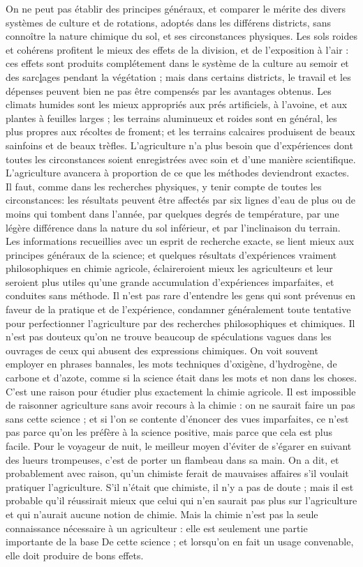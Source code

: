 On ne peut pas établir des principes généraux, et comparer le mérite des divers systèmes de culture et de rotations, adoptés dans les différens districts, sans connoître la nature chimique du sol, et ses circonstances physiques. Les sols roides et cohérens profitent le mieux des effets de la division, et de l'exposition à l'air : ces effets sont produits complétement dans le système de la culture au semoir et des sarc\underline{l}ages pendant la végétation ; mais dans certains districts, le travail et les dépenses peuvent bien ne pas être compensés par les avantages obtenus. Les climats humides sont les mieux appropriés aux prés artificiels, à l'avoine, et aux plantes à feuilles larges ; les terrains\setcounter{page}{353} aluminueux et roides sont en général, les plus propres aux récoltes de froment; et les terrains calcaires produisent de beaux sainfoins et de beaux trèfles.
L'agriculture n'a plus besoin que d'expériences dont toutes les circonstances soient enregistrées avec soin et d'une manière scientifique. L'agriculture avancera à proportion de ce que les méthodes deviendront exactes. Il faut, comme dans les recherches physiques, y tenir compte de toutes les circonstances: les résultats peuvent être affectés par six lignes d'eau de plus ou de moins qui tombent dans l'année, par quelques degrés de température, par une légère différence dans la nature du sol inférieur, et par l'inclinaison du terrain.
Les informations recueillies avec un esprit de recherche exacte, se lient mieux aux principes généraux de la science; et quelques résultats d'expériences vraiment philosophiques en chimie agricole, éclaireroient mieux les agriculteurs et leur seroient plus utiles qu'une grande accumulation d'expériences imparfaites, et conduites sans méthode. Il n'est pas rare d'entendre les gens qui sont prévenus en faveur de la pratique et de l'expérience, condamner généralement toute tentative pour perfectionner l'agriculture par\setcounter{page}{354} des recherches philosophiques et chimiques. Il n'est pas douteux qu'on ne trouve beaucoup de spéculations vagues dans les ouvrages de ceux qui abusent des expressions chimiques. On voit souvent employer en phrases bannales, les mots techniques d'oxigène, d'hydrogène, de carbone et d'azote, comme si la science était dans les mots et non dans les choses. C'est une raison pour étudier plus exactement la chimie agricole. Il est impossible de raisonner agriculture sans avoir recours à la chimie : on ne saurait faire un pas sans cette science ; et si l'on se contente d'énoncer des vues imparfaites, ce n'est pas parce qu'on les préfère à la science positive, mais parce que cela est plus facile. Pour le voyageur de nuit, le meilleur moyen d'éviter de s'égarer en suivant des lueurs trompeuses, c'est de porter un flambeau dans sa main. On a dit, et probablement avec raison, qu'un chimiste ferait de mauvaises affaires s'il voulait pratiquer l'agriculture. S'il n'était que chimiste, il n'y a pas de doute ; mais il est probable qu'il réussirait mieux que celui qui n'en saurait pas plus sur l'agriculture et qui n'aurait aucune notion de chimie. Mais la chimie n'est pas la seule connaissance nécessaire à un agriculteur : elle est seulement une partie importante de la base\setcounter{page}{355} De cette science ; et lorsqu'on en fait un usage convenable, elle doit produire de bons effets.
